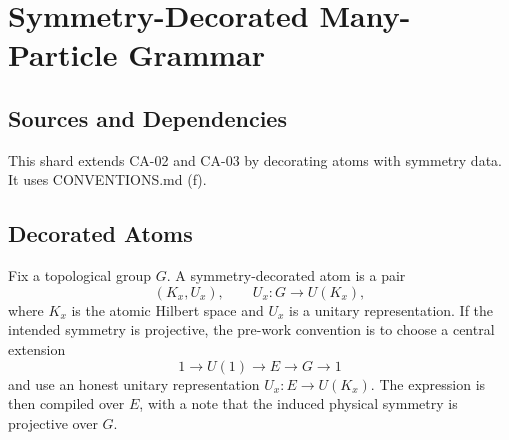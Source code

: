 
\section{Symmetry-Decorated Many-Particle Grammar}
\label{sec:symmetry-decorated-grammar}

\subsection{Sources and Dependencies}

This shard extends CA-02 and CA-03 by decorating atoms with symmetry data.  It
uses CONVENTIONS.md (f).


\subsection{Decorated Atoms}

Fix a topological group \(G\).  A symmetry-decorated atom is a pair
\[
  (K_x,U_x),\qquad U_x:G\to U(K_x),
\]
where \(K_x\) is the atomic Hilbert space and \(U_x\) is a unitary
representation.  If the intended symmetry is projective, the pre-work convention
is to choose a central extension
\[
  1\to U(1)\to E\to G\to 1
\]
and use an honest unitary representation \(U_x:E\to U(K_x)\).  The expression is
then compiled over \(E\), with a note that the induced physical symmetry is
projective over \(G\).

